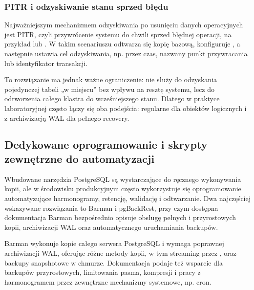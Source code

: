 \documentclass[letterpaper,10pt,polish]{sphinxmanual}
\begin{document}
\subsubsection{PITR i odzyskiwanie stanu sprzed błędu}
\label{\detokenize{rozdzia_u0142_2/rozdzia_u0142_28/index:pitr-i-odzyskiwanie-stanu-sprzed-bledu}}
\sphinxAtStartPar
Najważniejszym mechanizmem odzyskiwania po usunięciu danych operacyjnych jest PITR, czyli przywrócenie systemu do chwili sprzed błędnej operacji, na przykład  lub . W takim scenariuszu odtwarza się kopię bazową, konfiguruje , a następnie ustawia cel odzyskiwania, np. przez czas, nazwany punkt przywracania lub identyfikator transakcji.

\sphinxAtStartPar
To rozwiązanie ma jednak ważne ograniczenie: nie służy do odzyskania pojedynczej tabeli „w miejscu” bez wpływu na resztę systemu, lecz do odtworzenia całego klastra do wcześniejszego stanu. Dlatego w praktyce laboratoryjnej często łączy się oba podejścia: regularne  dla obiektów logicznych i  z archiwizacją WAL dla pełnego recovery.


\subsection{Dedykowane oprogramowanie i skrypty zewnętrzne do automatyzacji}
\label{\detokenize{rozdzia_u0142_2/rozdzia_u0142_28/index:dedykowane-oprogramowanie-i-skrypty-zewnetrzne-do-automatyzacji}}
\sphinxAtStartPar
Wbudowane narzędzia PostgreSQL są wystarczające do ręcznego wykonywania kopii, ale w środowisku produkcyjnym często wykorzystuje się oprogramowanie automatyzujące harmonogramy, retencję, walidację i odtwarzanie. Dwa najczęściej wskazywane rozwiązania to Barman i pgBackRest, przy czym dostępna dokumentacja Barman bezpośrednio opisuje obsługę pełnych i przyrostowych kopii, archiwizacji WAL oraz automatycznego uruchamiania backupów.

\sphinxAtStartPar
Barman wykonuje kopie całego serwera PostgreSQL i wymaga poprawnej archiwizacji WAL, oferując różne metody kopii, w tym streaming przez ,  oraz backupy snapshotowe w chmurze. Dokumentacja podaje też wsparcie dla backupów przyrostowych, limitowania pasma, kompresji i pracy z harmonogramem przez zewnętrzne mechanizmy systemowe, np. cron.
\end{document}
